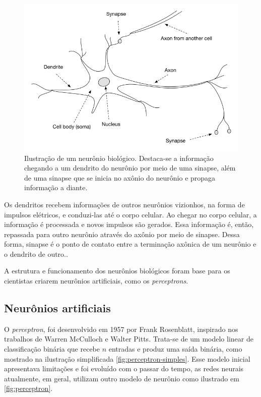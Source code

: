 \begin{figure}[H] 
  \includegraphics[width= 12cm]{../figuras/neuron.png}
  \caption{Ilustração de um neurônio biológico. \cite{dl-oreilly}
  Destaca-se a informação chegando a um dendrito do neurônio
  por meio de uma sinapse, além de uma sinapse que se inicia no axônio 
  do neurônio e propaga informação a diante.
  }
  \label{fig:neuron}
\end{figure}

Os dendritos recebem 
informações de outros neurônios vizionhos, na forma de impulsos
elétricos, e conduzi-las até o corpo celular. Ao chegar no corpo
celular, a informação é processada e novos impulsos são gerados. 
Essa informação é, então, repassada para outro neurônio 
através do axônio por meio de sinapse. Dessa forma, sinapse é o
ponto de contato entre a terminação axônica de um neurônio e o 
dendrito de outro.\cite{deeplearningbook}. 

A estrutura e funcionamento dos neurônios biológicos foram 
base para os cientistas criarem neurônios artificiais, como 
os \textit{perceptrons}. 

\subsection{Neurônios artificiais}

O \textit{perceptron}, foi desenvolvido em 1957 por Frank 
Rosenblatt, inspirado nos trabalhos de Warren McCulloch e Walter Pitts.
Trata-se de um modelo linear de classificação binária que 
recebe $n$ entradas e produz uma saída binária, como mostrado 
na ilustração simplificada \ref{fig:perceptron-simples}.\cite{deeplearningbook}
Esse modelo inicial apresentava limitações e foi evoluído com o passar do 
tempo, as redes neurais atualmente, em geral, utilizam 
outro modelo de neurônio como ilustrado em \ref{fig:perceptron}.


